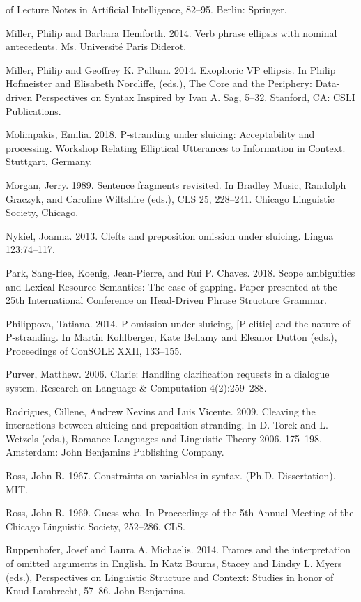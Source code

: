 \documentclass[output=paper
                ,modfonts
                ,nonflat
	        ,collection
	        ,collectionchapter
	        ,collectiontoclongg
 	        ,biblatex
                ,babelshorthands
                ,newtxmath
                ,draftmode
                ,colorlinks, citecolor=brown
]{./langsci/langscibook}
\begin{document}
\begin{description}
of Lecture Notes in Artificial Intelligence, 82--95. Berlin: Springer.
\item Miller, Philip and Barbara Hemforth. 2014. Verb phrase ellipsis with nominal antecedents.
Ms. Universit\'{e} Paris Diderot.
\item Miller, Philip and Geoffrey K. Pullum. 2014. Exophoric VP ellipsis. In Philip Hofmeister and
Elisabeth Norcliffe, (eds.), The Core and the Periphery: Data-driven Perspectives on Syntax Inspired by Ivan A. Sag, 5--32. Stanford, CA: CSLI Publications.
\item Molimpakis, Emilia. 2018. P-stranding under sluicing: Acceptability and processing. Workshop Relating Elliptical Utterances to Information in Context. Stuttgart, Germany.
\item Morgan, Jerry. 1989. Sentence fragments revisited. In Bradley Music, Randolph Graczyk, and Caroline Wiltshire (eds.), CLS 25, 228--241. Chicago Linguistic Society, Chicago.
\item Nykiel, Joanna. 2013. Clefts and preposition omission under sluicing. Lingua 123:74--117.
\item Park, Sang-Hee, Koenig, Jean-Pierre, and Rui P. Chaves. 2018. Scope ambiguities and Lexical Resource Semantics: The case of gapping. Paper presented at the 25th International Conference on Head-Driven Phrase Structure Grammar.
\item Philippova, Tatiana. 2014. P-omission under sluicing, [P clitic] and the nature of P-stranding. In Martin Kohlberger, Kate Bellamy and Eleanor Dutton (eds.), Proceedings of ConSOLE XXII, 133--155.
\item Purver, Matthew. 2006. Clarie: Handling clarification requests in a dialogue system. Research
on Language \& Computation 4(2):259--288.
\item Rodrigues, Cillene, Andrew Nevins and Luis Vicente. 2009. Cleaving the interactions between sluicing and preposition stranding. In D. Torck and L. Wetzels (eds.), Romance Languages and Linguistic Theory 2006. 175--198. Amsterdam: John Benjamins Publishing Company.
\item Ross, John R. 1967. Constraints on variables in syntax. (Ph.D. Dissertation). MIT.
\item Ross, John R. 1969. Guess who. In Proceedings of the 5th Annual Meeting of the Chicago
Linguistic Society, 252--286. CLS.
\item Ruppenhofer, Josef  and Laura A. Michaelis. 2014. Frames and the interpretation of omitted arguments in English.
In Katz Bourns, Stacey and Lindsy L. Myers (eds.), Perspectives on Linguistic Structure and Context: Studies in honor of Knud Lambrecht, 57--86. John Benjamins.

\end{description}
\end{document}
